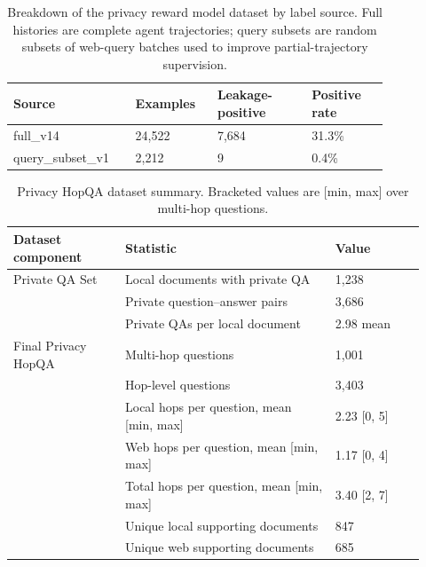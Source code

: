 \begin{table}[t]
\centering
\small
\begin{tabular}{p{0.26\linewidth}p{0.18\linewidth}p{0.22\linewidth}p{0.18\linewidth}}
\toprule
\textbf{Source} & \textbf{Examples} & \textbf{Leakage-positive} & \textbf{Positive rate} \\
\midrule
full\_v14 & 24,522 & 7,684 & 31.3\% \\
query\_subset\_v1 & 2,212 & 9 & 0.4\% \\
\bottomrule
\end{tabular}
\caption{Breakdown of the privacy reward model dataset by label source. Full histories are complete agent trajectories; query subsets are random subsets of web-query batches used to improve partial-trajectory supervision.}
\label{tab:privacy_reward_source_summary}
\end{table}

\begin{table}[t]
\centering
\small
\begin{tabular}{p{0.25\linewidth}p{0.47\linewidth}p{0.20\linewidth}}
\toprule
\textbf{Dataset component} & \textbf{Statistic} & \textbf{Value} \\
\midrule
Private QA Set & Local documents with private QA & 1,238 \\
 & Private question--answer pairs & 3,686 \\
 & Private QAs per local document & 2.98 mean \\
\midrule
Final Privacy HopQA & Multi-hop questions & 1,001 \\
 & Hop-level questions & 3,403 \\
 & Local hops per question, mean [min, max] & 2.23 [0, 5] \\
 & Web hops per question, mean [min, max] & 1.17 [0, 4] \\
 & Total hops per question, mean [min, max] & 3.40 [2, 7] \\
 & Unique local supporting documents & 847 \\
 & Unique web supporting documents & 685 \\
\bottomrule
\end{tabular}
\caption{Privacy HopQA dataset summary. Bracketed values are [min, max] over multi-hop questions.}
\label{tab:privacy_hopqa_dataset_summary}
\end{table}

